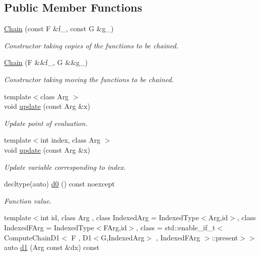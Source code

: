 \subsection*{Public Member Functions}
\begin{DoxyCompactItemize}
\item 
\hyperlink{structFunG_1_1MathematicalOperations_1_1Chain_a3167b6304026eb0bd92e57d0dd0087e0}{Chain} (const F \&f\+\_\+, const G \&g\+\_\+)
\begin{DoxyCompactList}\small\item\em Constructor taking copies of the functions to be chained. \end{DoxyCompactList}\item 
\hyperlink{structFunG_1_1MathematicalOperations_1_1Chain_a0c5cc51c17c31db3754edc016a745201}{Chain} (F \&\&f\+\_\+, G \&\&g\+\_\+)
\begin{DoxyCompactList}\small\item\em Constructor taking moving the functions to be chained. \end{DoxyCompactList}\item 
{\footnotesize template$<$class Arg $>$ }\\void \hyperlink{structFunG_1_1MathematicalOperations_1_1Chain_adb7f63859ef7dbdd08b0908c3a17794d}{update} (const Arg \&x)
\begin{DoxyCompactList}\small\item\em Update point of evaluation. \end{DoxyCompactList}\item 
{\footnotesize template$<$int index, class Arg $>$ }\\void \hyperlink{structFunG_1_1MathematicalOperations_1_1Chain_aa41d754e68072e0a9f1460da79f9913e}{update} (const Arg \&x)
\begin{DoxyCompactList}\small\item\em Update variable corresponding to index. \end{DoxyCompactList}\item 
decltype(auto) \hyperlink{structFunG_1_1MathematicalOperations_1_1Chain_a96de3ba6edeb9decba4c04ad9ddb48ff}{d0} () const noexcept
\begin{DoxyCompactList}\small\item\em Function value. \end{DoxyCompactList}\item 
{\footnotesize template$<$int id, class Arg , class Indexed\+Arg  = Indexed\+Type$<$\+Arg,id$>$, class Indexed\+F\+Arg  = Indexed\+Type$<$\+F\+Arg,id$>$, class  = std\+::enable\+\_\+if\+\_\+t$<$ Compute\+Chain\+D1$<$ F , D1$<$\+G,\+Indexed\+Arg$>$ , Indexed\+F\+Arg $>$\+::present$>$$>$ }\\auto \hyperlink{structFunG_1_1MathematicalOperations_1_1Chain_adfe741dee89257258b39df846fd16cf7}{d1} (Arg const \&dx) const 

\end{DoxyCompactItemize}
